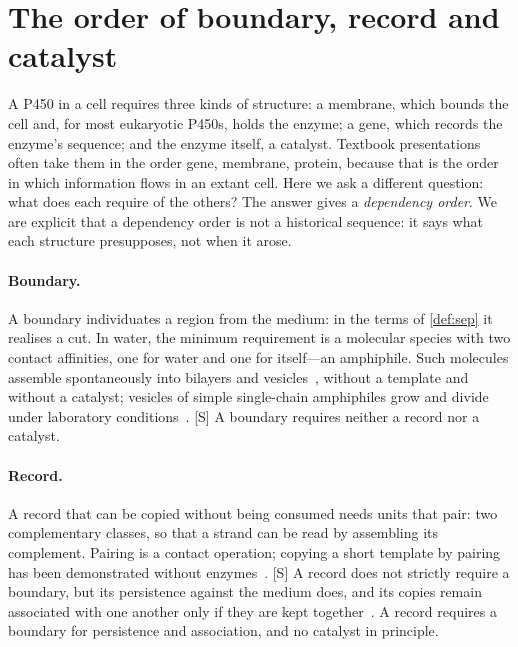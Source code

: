\documentclass[10pt,twocolumn,a4paper]{article}
\newcommand{\Sup}{\textsf{[S]}}
\begin{document}
\section{The order of boundary, record and catalyst}
\label{sec:order}

A P450 in a cell requires three kinds of structure: a membrane, which bounds
the cell and, for most eukaryotic P450s, holds the enzyme; a gene, which
records the enzyme's sequence; and the enzyme itself, a catalyst. Textbook
presentations often take them in the order gene, membrane, protein, because
that is the order in which information flows in an extant cell. Here we ask
a different question: what does each require of the others? The answer gives
a \emph{dependency order}. We are explicit that a dependency order is not a
historical sequence: it says what each structure presupposes, not when it
arose.

\paragraph{Boundary.}
A boundary individuates a region from the medium: in the terms of
\cref{def:sep} it realises a cut. In water, the minimum requirement is a
molecular species with two contact affinities, one for water and one for
itself---an amphiphile. Such molecules assemble spontaneously into bilayers
and vesicles~\citep{tanford1980}, without a template and without a catalyst;
vesicles of simple single-chain amphiphiles grow and divide under laboratory
conditions~\citep{hanczyc2003}. \Sup{} A boundary requires neither a record
nor a catalyst.

\paragraph{Record.}
A record that can be copied without being consumed needs units that pair:
two complementary classes, so that a strand can be read by assembling its
complement. Pairing is a contact operation; copying a short template by
pairing has been demonstrated without enzymes~\citep{orgel2004}. \Sup{} A
record does not strictly require a boundary, but its persistence against the
medium does, and its copies remain associated with one another only if they
are kept together~\citep{szostak2001}. A record requires a boundary for
persistence and association, and no catalyst in principle.
\end{document}
